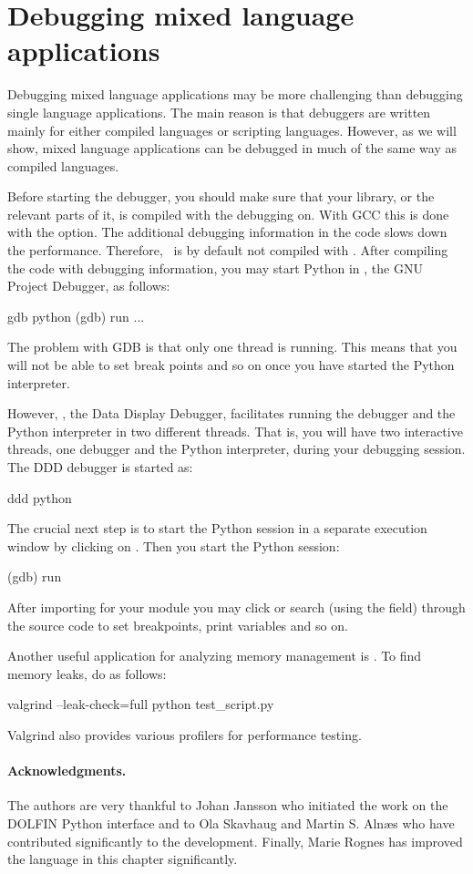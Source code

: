 \section{Debugging mixed language applications}

Debugging mixed language applications may be more challenging than
debugging single language applications.  The main reason is that
debuggers are written mainly for either compiled languages or scripting
languages. However, as we will show, mixed language applications can be
debugged in much of the same way as compiled languages.

Before starting the debugger, you should make sure that your library,
or the relevant parts of it, is compiled with the debugging on. With
GCC this is done with the  option. The additional debugging
information in the code slows down the performance. Therefore, \dolfin\
is by default not compiled with .  After compiling the code
with debugging information, you may start Python in \citet{www:gdb},
the GNU Project Debugger, as follows:
\begin{bash}
gdb python
(gdb) run
...
\end{bash}
The problem with GDB is that only one thread is running. This means that
you will not be able to set break points and so on once you have started
the Python interpreter.

However, \citet{www:ddd}, the Data Display Debugger, facilitates running
the debugger and the Python interpreter in two different threads. That
is, you will have two interactive threads, one debugger and the Python
interpreter, during your debugging session. The DDD debugger is started
as:
\begin{bash}
ddd python
\end{bash}
The crucial next step is to start the Python session in a separate
execution window by clicking on \emp{View->Execution Window}.  Then you
start the Python session:
\begin{bash}
(gdb) run
\end{bash}
After importing for your module you may click or search (using the
\emp{Lookup} field) through the source code to set breakpoints, print
variables and so on.

Another useful application for analyzing memory management is
\citet{www:valgrind}. To find memory leaks, do as follows:
\begin{bash}
valgrind --leak-check=full python test_script.py
\end{bash}
Valgrind also provides various profilers for performance testing.

\paragraph{Acknowledgments.}

The authors are very thankful to Johan Jansson who initiated the work
on the DOLFIN Python interface and to Ola Skavhaug and Martin
S. Aln\ae s who have contributed significantly to the development.
Finally, Marie Rognes has improved the language in this chapter
significantly.
